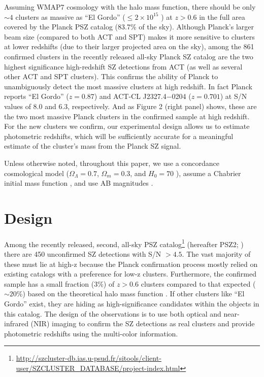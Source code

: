 \documentclass[apj, revtex4]{emulateapj}
\begin{document}
Assuming WMAP7 cosmology \citep{Komatsu2011} with the \cite{Tinker2008} halo mass function, there should be only $\sim4$ clusters as massive as “El Gordo” ($\leq 2 \times 10^{15}$ \Msol) at $z > 0.6$ in the full area covered by the Planck PSZ catalog (83.7\% of the sky). Although Planck’s larger beam size (compared to both ACT and SPT) makes it more sensitive to clusters at lower redshifts (due to their larger projected area on the sky), among the 861 confirmed clusters in the recently released all-sky Planck SZ catalog are the two highest significance high-redshift SZ detections from ACT (as well as several other ACT and SPT clusters). This confirms the ability of Planck to unambiguously detect the most massive clusters at high redshift. In fact Planck reports ``El Gordo'' ($z = 0.87$) and ACT-CL J2327.4−0204 ($z = 0.701$) at S/N values of 8.0 and 6.3, respectively. And as Figure 2 (right panel) shows, these are the two most massive Planck clusters in the confirmed sample at high redshift. For the new clusters we confirm, our experimental design allows us to estimate photometric redshifts, which will be sufficiently accurate for a meaningful estimate of the cluster’s mass from the Planck SZ signal.

Unless otherwise noted, throughout this paper, we use a concordance cosmological model ($\Omega_\Lambda = 0.7$, $\Omega_m = 0.3$, and $H_0= 70$ \kms \mpc), assume a Chabrier initial mass function \citep{Chabrier2003}, and use AB magnitudes \citep{Oke1974}.

\section{Design}\label{sec:design}
Among the recently released, second, all-sky PSZ catalog\footnote{\hbox{\url{http://szcluster-db.ias.u-psud.fr/sitools/client-user/SZCLUSTER_DATABASE/project-index.html}}} (hereafter PSZ2; \citealt{PlanckCollaboration2015}) there are 450 unconfirmed SZ detections with S/N $> 4.5$. The vast majority of these must lie at high-z because the Planck confirmation process mostly relied on existing catalogs with a preference for low-z clusters. Furthermore, the confirmed sample has a small fraction (3\%) of $z > 0.6$ clusters compared to that expected ($\sim20$\%) based on the theoretical halo mass function \citep{Jenkins2001, Tinker2008}. If other clusters like ``El Gordo'' exist, they are hiding as high-significance candidates within the objects in this catalog. The design of the observations is to use both optical and near-infrared (NIR) imaging to confirm the SZ detections as real clusters and provide photometric redshifts using the multi-color information.
 
\end{document}
